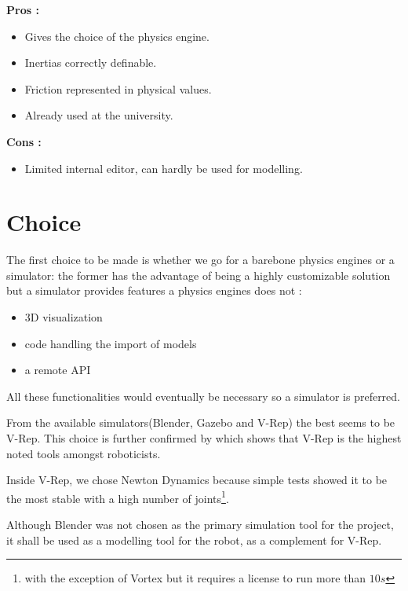 \textbf{Pros :}
\begin{itemize}
\item Gives the choice of the physics engine.
\item Inertias correctly definable.
\item Friction represented in physical values.
\item Already used at the university.
\end{itemize}

\textbf{Cons :}
\begin{itemize}
\item Limited internal editor, can hardly be used for modelling.
\end{itemize}

\section{Choice}
The first choice to be made is whether we go for a barebone physics engines or a simulator: the former has the advantage of being a highly customizable solution but a simulator provides features a physics engines does not :\begin{itemize}
\item 3D visualization
\item code handling the import of models
\item a remote API
\end{itemize}
All these functionalities would eventually be necessary so a simulator is preferred. 

From the available simulators(Blender, Gazebo and V-Rep) the best seems to be V-Rep. This choice is further confirmed by \cite{ivaldi2014tools} which shows that V-Rep is the highest noted tools amongst roboticists.

Inside V-Rep, we chose Newton Dynamics because simple tests showed it to be the most stable with a high number of joints\footnote{with the exception of Vortex but it requires a license to run more than $10s$}.

Although Blender was not chosen as the primary simulation tool for the project, it shall be used as a modelling tool for the robot, as a complement for V-Rep.
